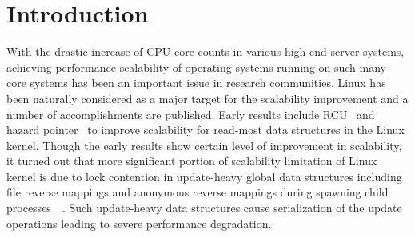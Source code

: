 \section{Introduction} \label{sec:introduction}

With the drastic increase of CPU core counts in various high-end
server systems, achieving performance scalability of operating systems
running on such many-core systems has been an important issue in research
communities.
Linux has been naturally considered as a major target for the scalability
improvement and a number of accomplishments are published.
Early results include RCU~\cite{McKenney98} and hazard
pointer~\cite{MagedMichael04a} to improve scalability for read-most data 
structures in the Linux kernel. %
Though the early results show certain level of improvement in scalability,
it turned out that more significant portion of scalability limitation of
Linux kernel is due to lock contention in update-heavy global data structures 
including file reverse mappings and anonymous reverse mappings during
spawning child processes~\cite{Andi2011adding}~\cite{Tim2013adding}. 
Such update-heavy data structures cause serialization of the update operations
leading to severe performance degradation. 




